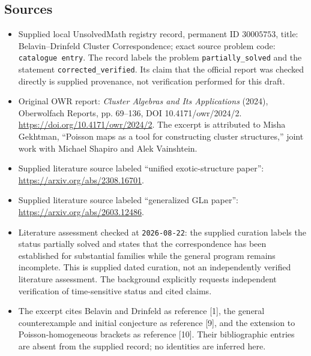 \documentclass[11pt]{article}
\begin{document}
\subsection{Sources}
\begin{itemize}
\item Supplied local UnsolvedMath registry record, permanent ID \(30005753\), title: Belavin--Drinfeld Cluster Correspondence; exact source problem code: \texttt{catalogue entry}. The record labels the problem \texttt{partially\_solved} and the statement \texttt{corrected\_verified}. Its claim that the official report was checked directly is supplied provenance, not verification performed for this draft.
\item Original OWR report: \emph{Cluster Algebras and Its Applications} (2024), Oberwolfach Reports, pp. 69--136, DOI 10.4171/owr/2024/2. \url{https://doi.org/10.4171/owr/2024/2}. The excerpt is attributed to Misha Gekhtman, ``Poisson maps as a tool for constructing cluster structures,'' joint work with Michael Shapiro and Alek Vainshtein.
\item Supplied literature source labeled ``unified exotic-structure paper'': \url{https://arxiv.org/abs/2308.16701}.
\item Supplied literature source labeled ``generalized GLn paper'': \url{https://arxiv.org/abs/2603.12486}.
\item Literature assessment checked at \texttt{2026-08-22}: the supplied curation labels the status partially solved and states that the correspondence has been established for substantial families while the general program remains incomplete. This is supplied dated curation, not an independently verified literature assessment. The background explicitly requests independent verification of time-sensitive status and cited claims.
\item The excerpt cites Belavin and Drinfeld as reference [1], the general counterexample and initial conjecture as reference [9], and the extension to Poisson-homogeneous brackets as reference [10]. Their bibliographic entries are absent from the supplied record; no identities are inferred here.
\end{itemize}
\end{document}
